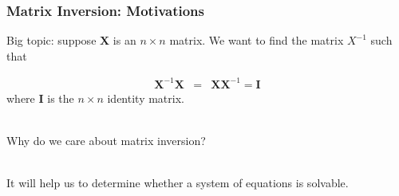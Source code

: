 \documentclass{beamer}
\numberwithin{equation}{section}
\begin{document}
\begin{frame}
\frametitle{Matrix Inversion: Motivations}

Big topic: suppose $\boldsymbol{X}$ is an $n \times n$ matrix.  We want to find the matrix $X^{-1}$ such that 

\begin{eqnarray}
\boldsymbol{X}^{-1} \boldsymbol{X} & = & \boldsymbol{X} \boldsymbol{X}^{-1} = \boldsymbol{I} \nonumber 
\end{eqnarray}
where $\boldsymbol{I}$ is the $n \times n$ identity matrix.  \\ \pause

\ \\Why do we care about matrix inversion? \pause

\ \\It will help us to determine whether a system of equations is solvable.



\end{frame}
\end{document}
